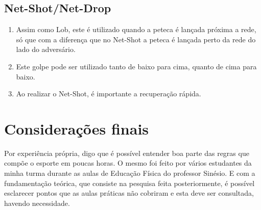 \documentclass[
	article,			%
	11pt,				%
	oneside,			%
	a4paper,			%
	english,			%
	brazil,				%
	sumario=tradicional
	]{abntex2}
\begin{document}
\subsection{Net-Shot/Net-Drop}
\begin{enumerate}
	\item Assim como Lob, este é utilizado quando a peteca é lançada próxima a rede, só que com a diferença que no Net-Shot a peteca é lançada perto da rede do lado do adversário.
	\item Este golpe pode ser utilizado tanto de baixo para cima, quanto de cima para baixo.
	\item Ao realizar o Net-Shot, é importante a recuperação rápida.
\end{enumerate}

% 

\section{Considerações finais}
Por experiência própria, digo que é possível entender boa parte das regras que compõe o esporte em poucas horas. O mesmo foi feito por vários estudantes da minha turma durante as aulas de Educação Física do professor Sinésio. E com a fundamentação teórica, que consiste na pesquisa feita posteriormente, é possível esclarecer pontos que as aulas práticas não cobriram e esta deve ser consultada, havendo necessidade. 


\end{document}
